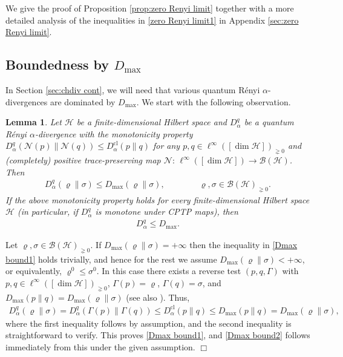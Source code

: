 \documentclass[unsortedaddress,superscriptaddress,pra,notitlepage]{revtex4}
\newtheorem{lemma}[definition]{Lemma}
\newenvironment{proof}[1][Proof]{\begin{trivlist}
\item[\hskip \labelsep {\bfseries #1}]}{\hfill$\Box$\end{trivlist}}
\def\B{{\mathcal B}}
\def\N{\mathcal{N}}
\def\rho{\varrho}
\def\hil{{\mathcal H}}
\def\pne{_{\gneq 0}}
\def\cl{\mathrm{cl}}
\def\cl{\mathrm{cl}}
\newcommand{\ds}{\mbox{ }\mbox{ }}
\begin{document}
We give the proof of Proposition \ref{prop:zero Renyi limit}
together with a more detailed analysis of the inequalities in 
\eqref{zero Renyi limit1} in Appendix \ref{sec:zero Renyi limit}.


\subsection{Boundedness by $D_{\max}$}
\label{sec:Dmax bound}

In Section \ref{sec:chdiv cont},
we will need that various quantum R\'enyi $\alpha$-divergences are dominated by 
$D_{\max}$.
We start with the following observation.

\begin{lemma}\label{lemma:Dmax bound}
Let $\hil$ be a finite-dimensional Hilbert space and $D_{\alpha}^q$ be a quantum 
R\'enyi $\alpha$-divergence 
with the monotonicity property 
$D_{\alpha}^q(\N(p)\|\N(q))\le D_{\alpha}^{\cl}(p\|q)$ for any 
$p,q\in\ell^{\infty}([\dim\hil])\pne$
and (completely) positive 
trace-preserving map $\N:\,\ell^{\infty}([\dim\hil])\to\B(\hil)$. Then 
\begin{align}\label{Dmax bound1}
D_{\alpha}^q(\rho\|\sigma)\le D_{\max}(\rho\|\sigma),
\ds\ds\ds \rho,\sigma\in\B(\hil)\pne.
\end{align}
If the above monotonicity property holds for every finite-dimensional Hilbert space $\hil$ 
(in particular, if $D_{\alpha}^q$ is monotone under CPTP maps), then 
\begin{align}\label{Dmax bound2}
D_{\alpha}^q\le D_{\max}.
\end{align}
\end{lemma}
\begin{proof}
Let $\rho,\sigma\in\B(\hil)\pne$.
If $D_{\max}(\rho\|\sigma)=+\infty$ then the inequality in 
\eqref{Dmax bound1} holds trivially, and hence for the rest we assume $D_{\max}(\rho\|\sigma)<+\infty$, or equivalently, 
$\rho^0\le\sigma^0$. In this case there exists a reverse test $(p,q,\Gamma)$
with $p,q\in\ell^{\infty}([\dim\hil])\pne$, $\Gamma(p)=\rho$, $\Gamma(q)=\sigma$, 
and $D_{\max}(p\|q)=D_{\max}(\rho\|\sigma)$
\cite[Section 4.2]{Matsumoto_newfdiv} (see also \cite[Section 4.2.3]{TomamichelBook}).
Thus, 
\begin{align*}
D_{\alpha}^q(\rho\|\sigma)=D_{\alpha}^q(\Gamma(p)\|\Gamma(q))
\le D_{\alpha}^{\cl}(p\|q)\le D_{\max}(p\|q)
=
D_{\max}(\rho\|\sigma),
\end{align*}
where the first inequality follows by assumption, and the second inequality
is straightforward to verify. This proves \eqref{Dmax bound1}, and 
\eqref{Dmax bound2} follows immediately from this under the given assumption.
\end{proof}
\end{document}
